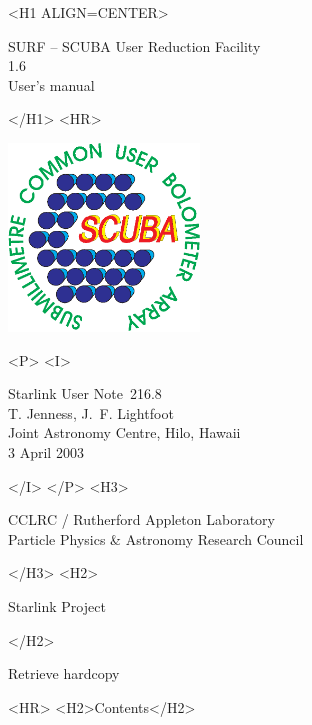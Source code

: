 \documentclass[twoside,11pt]{article}
\newcommand{\stardoccategory}  {Starlink User Note}
\newcommand{\stardocsource}    {sun\stardocnumber}
\newcommand{\stardocnumber}    {216.8}
\newcommand{\stardocauthors}   {T. Jenness, J.~F. Lightfoot\\
                                Joint Astronomy Centre, Hilo, Hawaii}
\newcommand{\stardocdate}      {3 April 2003}
\newcommand{\stardoctitle}     {SURF -- SCUBA User Reduction Facility}
\newcommand{\stardocversion}   {1.6}
\newcommand{\stardocmanual}    {User's manual}
\newcommand{\htmladdnormallink}[2]{#1}
\newcommand{\htmladdimg}[1]{}
\newcommand{\htmlref}[2]{#1}
\newcommand{\htmladdtonavigation}[1]{}
\newcommand{\xlabel}[1]{}
\renewcommand{\_}{\texttt{\symbol{95}}}
\begin{document}
\begin{htmlonly}
   \xlabel{}
   \begin{rawhtml} <H1 ALIGN=CENTER> \end{rawhtml}
      \stardoctitle\\
      \stardocversion\\
      \stardocmanual
   \begin{rawhtml} </H1> <HR> \end{rawhtml}

\includegraphics[width=2.0in]{sun216_logo.eps}

   \begin{rawhtml} <P> <I> \end{rawhtml}
   \stardoccategory\ \stardocnumber \\
   \stardocauthors \\
   \stardocdate
   \begin{rawhtml} </I> </P> <H3> \end{rawhtml}
      \htmladdnormallink{CCLRC}{http://www.cclrc.ac.uk} /
      \htmladdnormallink{Rutherford Appleton Laboratory}
                        {http://www.cclrc.ac.uk/ral} \\
      \htmladdnormallink{Particle Physics \& Astronomy Research Council}
                        {http://www.pparc.ac.uk} \\
   \begin{rawhtml} </H3> <H2> \end{rawhtml}
      \htmladdnormallink{Starlink Project}{http://star-www.rl.ac.uk/}
   \begin{rawhtml} </H2> \end{rawhtml}
   \htmladdnormallink{\htmladdimg{source.gif} Retrieve hardcopy}
      {http://star-www.rl.ac.uk/cgi-bin/hcserver?\stardocsource}\\

  \label{stardoccontents}
  \begin{rawhtml} 
    <HR>
    <H2>Contents</H2>
  \end{rawhtml}
  \htmladdtonavigation{\htmlref{\htmladdimg{contents_motif.gif}}
        {stardoccontents}}


\end{htmlonly}
\end{document}
